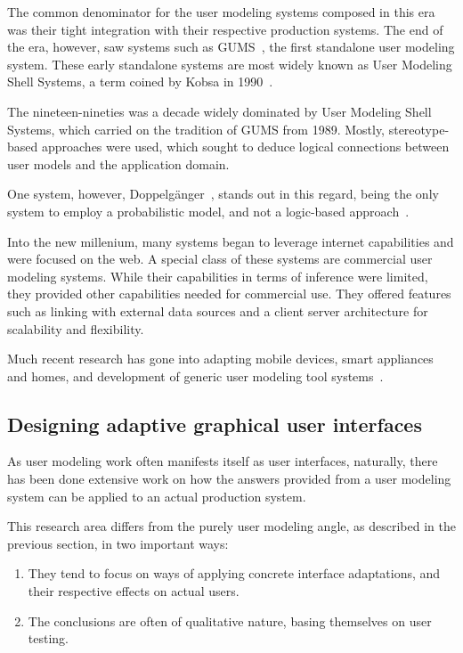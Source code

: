     The common denominator for the user modeling systems composed in this era was their tight integration with their respective production systems. The end of the era, however, saw systems such as GUMS~\cite{Finin1989}, the first standalone user modeling system. These early standalone systems are most widely known as User Modeling Shell Systems, a term coined by Kobsa in 1990~\cite{Kobsa1990}.

    The nineteen-nineties was a decade widely dominated by User Modeling Shell Systems, which carried on the tradition of GUMS from 1989. Mostly, stereotype-based approaches were used, which sought to deduce logical connections between user models and the application domain.

    One system, however, Doppelgänger~\cite{Orwant1995}, stands out in this regard, being the only system to employ a probabilistic model, and not a logic-based approach~\cite{Kobsa2001,Pohl1997,Pohl1999}.

    Into the new millenium, many systems began to leverage internet capabilities and were focused on the web. A special class of these systems are commercial user modeling systems. While their capabilities in terms of inference were limited, they provided other capabilities needed for commercial use. They offered features such as linking with external data sources and a client server architecture for scalability and flexibility.

    Much recent research has gone into adapting mobile devices, smart appliances and homes, and development of generic user modeling tool systems~\cite{Vrieze,Gajos2006,Findlater2008}.

  \subsection{Designing adaptive graphical user interfaces}

    As user modeling work often manifests itself as user interfaces, naturally, there has been done extensive work on how the answers provided from a user modeling system can be applied to an actual production system.

    This research area differs from the purely user modeling angle, as described in the previous section, in two important ways:

    \begin{enumerate}
      \item They tend to focus on ways of applying concrete interface adaptations, and their respective effects on actual users.
      \item The conclusions are often of qualitative nature, basing themselves on user testing.
    \end{enumerate}

